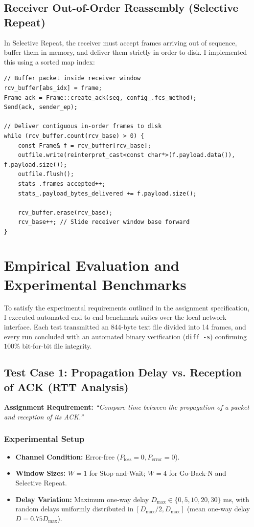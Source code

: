 \documentclass[11pt,a4paper]{article}
\begin{document}
\subsection{Receiver Out-of-Order Reassembly (Selective Repeat)}
In Selective Repeat, the receiver must accept frames arriving out of sequence, buffer them in memory, and deliver them strictly in order to disk. I implemented this using a sorted map index:
\begin{lstlisting}[caption={Out-of-Order Buffering and Contiguous Delivery (\texttt{src/selective\_repeat.cpp})}]
// Buffer packet inside receiver window
rcv_buffer[abs_idx] = frame;
Frame ack = Frame::create_ack(seq, config_.fcs_method);
Send(ack, sender_ep);

// Deliver contiguous in-order frames to disk
while (rcv_buffer.count(rcv_base) > 0) {
    const Frame& f = rcv_buffer[rcv_base];
    outfile.write(reinterpret_cast<const char*>(f.payload.data()), f.payload.size());
    outfile.flush();
    stats_.frames_accepted++;
    stats_.payload_bytes_delivered += f.payload.size();

    rcv_buffer.erase(rcv_base);
    rcv_base++; // Slide receiver window base forward
}
\end{lstlisting}

\FloatBarrier
\section{Empirical Evaluation and Experimental Benchmarks}

To satisfy the experimental requirements outlined in the assignment specification, I executed automated end-to-end benchmark suites over the local network interface. 
Each test transmitted an 844-byte text file divided into 14 frames, and every run concluded with an automated binary verification (\texttt{diff -s}) confirming $100\%$ bit-for-bit file integrity.

\subsection{Test Case 1: Propagation Delay vs. Reception of ACK (RTT Analysis)}
\textbf{Assignment Requirement:} \textit{``Compare time between the propagation of a packet and reception of its ACK.''}

\subsubsection{Experimental Setup}
\begin{itemize}
    \item \textbf{Channel Condition:} Error-free ($P_{\text{loss}} = 0, P_{\text{error}} = 0$).
    \item \textbf{Window Sizes:} $W = 1$ for Stop-and-Wait; $W = 4$ for Go-Back-N and Selective Repeat.
    \item \textbf{Delay Variation:} Maximum one-way delay $D_{\max} \in \{0, 5, 10, 20, 30\}\text{ ms}$, with random delays uniformly distributed in $[D_{\max}/2, D_{\max}]$ (mean one-way delay $\bar{D} = 0.75 D_{\max}$).
\end{itemize}
\end{document}
